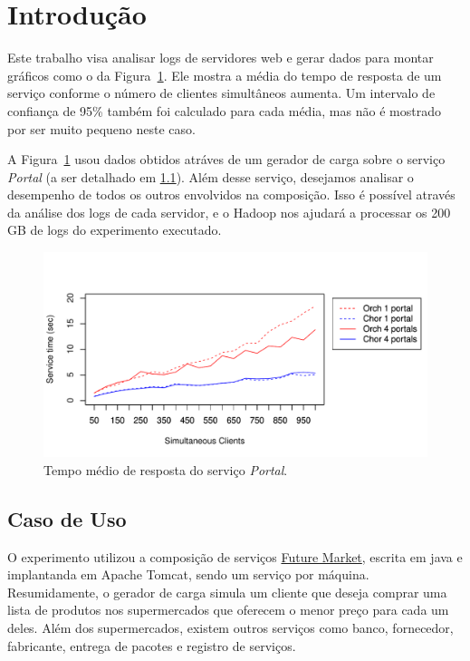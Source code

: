 \documentclass[brazil, a4paper,12pt]{article}
\begin{document}
\section{Introdução}

Este trabalho visa analisar logs de servidores web e gerar dados para montar
gráficos como o da Figura~\ref{fig:portal}. Ele mostra a média do tempo de
resposta de um serviço conforme o número de clientes simultâneos aumenta. Um
intervalo de confiança de 95\% também foi calculado para cada média, mas não é
mostrado por ser muito pequeno neste caso.

A Figura~\ref{fig:portal} usou dados obtidos atráves de um gerador de carga
sobre o serviço \emph{Portal} (a ser detalhado em \ref{sec:fmarket}). Além
desse serviço, desejamos analisar o desempenho de todos os outros envolvidos na
composição. Isso é possível através da análise dos logs de cada servidor, e o
Hadoop nos ajudará a processar os 200 GB de logs do experimento executado.

\begin{figure}[!ht]
  \begin{center}
    \includegraphics[width=\linewidth,clip=true,trim=1mm 6mm 3mm 20mm]{../talk/figures/portals1-4}
  \caption{Tempo médio de resposta do serviço \emph{Portal}.}
  \end{center}
  \label{fig:portal}
\end{figure}

\subsection{Caso de Uso}
\label{sec:fmarket}

O experimento utilizou a composição de serviços
\href{http://github.com/choreos/future_market_choreography/}{Future Market},
escrita em java e implantanda em Apache Tomcat, sendo um serviço por máquina.
Resumidamente, o gerador de carga simula um cliente que deseja comprar uma
lista de produtos nos supermercados que oferecem o menor preço para cada um
deles. Além dos supermercados, existem outros serviços como banco, fornecedor,
  fabricante, entrega de pacotes e registro de serviços.
\end{document}
